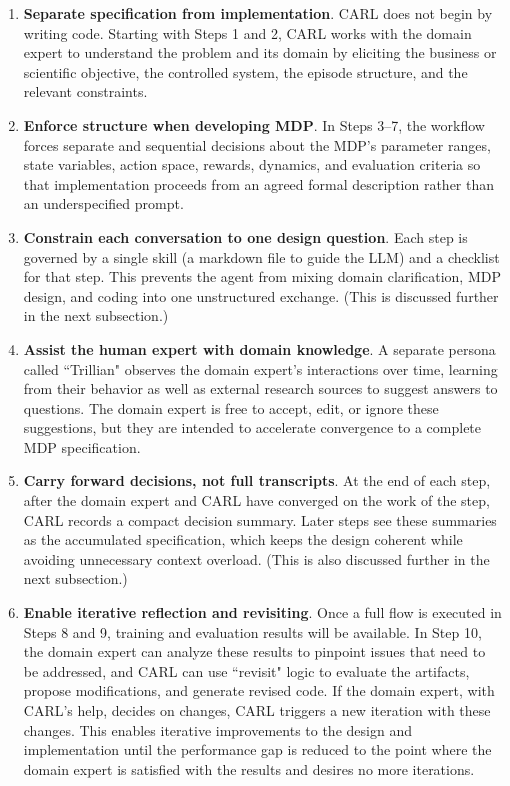 \documentclass[mnsc,sglanonrev]{informs4}
\begin{document}
\begin{enumerate}[label=\arabic*.]
\item \textbf{Separate specification from implementation}. CARL does not begin by writing code. Starting with Steps 1 and 2, CARL works with the domain expert to understand the problem and its domain by eliciting the business or scientific objective, the controlled system, the episode structure, and the relevant constraints. 
\item \textbf{Enforce structure when developing MDP}. In Steps 3--7, the workflow forces separate and sequential decisions about the MDP's parameter ranges, state variables, action space, rewards, dynamics, and evaluation criteria so that implementation proceeds from an agreed formal description rather than an underspecified prompt.
\item \textbf{Constrain each conversation to one design question}. Each step is governed by a single skill (a markdown file to guide the LLM) and a checklist for that step. This prevents the agent from mixing domain clarification, MDP design, and coding into one unstructured exchange. (This is discussed further in the next subsection.)
\item \textbf{Assist the human expert with domain knowledge}. A separate persona called ``Trillian" observes the domain expert's interactions over time, learning from their behavior as well as external research sources to suggest answers to questions. The domain expert is free to accept, edit, or ignore these suggestions, but they are intended to accelerate convergence to a complete MDP specification.
\item \textbf{Carry forward decisions, not full transcripts}. At the end of each step, after the domain expert and CARL have converged on the work of the step, CARL records a compact decision summary. Later steps see these summaries as the accumulated specification, which keeps the design coherent while avoiding unnecessary context overload. (This is also discussed further in the next subsection.)
\item \textbf{Enable iterative reflection and revisiting}. Once a full flow is executed in Steps 8 and 9, training and evaluation results will be available. In Step 10, the domain expert can analyze these results to pinpoint issues that need to be addressed, and CARL can use ``revisit" logic to evaluate the artifacts, propose modifications, and generate revised code. If the domain expert, with CARL's help, decides on changes, CARL triggers a new iteration with these changes. This enables iterative improvements to the design and implementation until the performance gap is reduced to the point where the domain expert is satisfied with the results and desires no more iterations. 
\end{enumerate}
\end{document}
